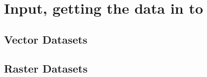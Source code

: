 \chapter{Input, getting the data in to \GeoTools}\label{input}
\section{Vector Datasets}\label{vector}
\section{Raster Datasets}\label{raster}